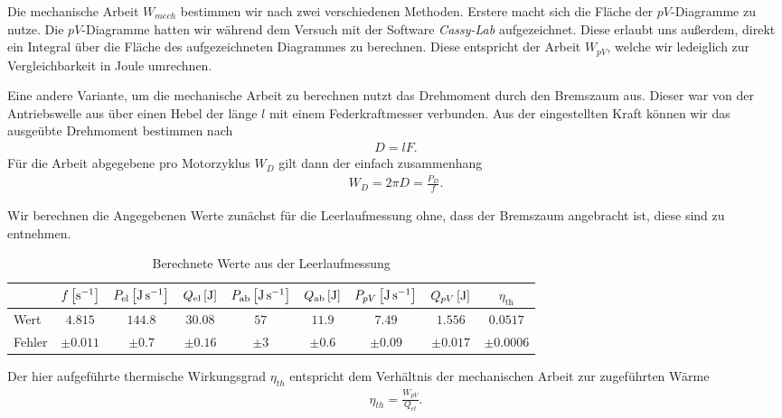 Die mechanische Arbeit $W_{mech}$ bestimmen wir nach zwei verschiedenen Methoden. Erstere macht sich die Fläche der $pV$-Diagramme zu nutze. Die $pV$-Diagramme hatten wir während dem Versuch mit der Software \textit{Cassy-Lab} aufgezeichnet. Diese erlaubt uns außerdem, direkt ein Integral über die Fläche des aufgezeichneten Diagrammes zu berechnen. Diese entspricht der Arbeit $W_{pV}$, welche wir ledeiglich zur Vergleichbarkeit in Joule umrechnen.

Eine andere Variante, um die mechanische Arbeit zu berechnen nutzt das Drehmoment durch den Bremszaum aus. Dieser war von der Antriebswelle aus über einen Hebel der länge $l$ mit einem Federkraftmesser verbunden. Aus der eingestellten Kraft können wir das ausgeübte Drehmoment bestimmen nach
\begin{align}
    D = l F.
\end{align}
Für die Arbeit abgegebene pro Motorzyklus $W_D$ gilt dann der einfach zusammenhang
\begin{align}
    W_D = 2 \pi D = \frac{P_D}{f}.
\end{align}

Wir berechnen die Angegebenen Werte zunächst für die Leerlaufmessung ohne, dass der Bremszaum angebracht ist, diese sind  zu entnehmen. 

\begin{table}[h!]
    \centering
    \begin{tabular}{l | c | c | c | c | c | c | c | c}
    \textbf{} & \boldmath$f\,\qty[\si{\per\second}]$ & \boldmath$P_{\text{el}}\,\qty[\si{\joule\per\second}]$ & \boldmath$Q_{\text{el}}\,\qty[\si{\joule}]$ & \boldmath$P_{\text{ab}}\,\qty[\si{\joule\per\second}]$ & \boldmath$Q_{\text{ab}}\,\qty[\si{\joule}]$ & \boldmath$P_{pV}\,\qty[\si{\joule\per\second}]$ & \boldmath$Q_{pV}\,\qty[\si{\joule}]$ & \boldmath$\eta_{\text{th}}$ \\\hline
    Wert & $4.815$ & $144.8$ & $30.08$ & $57$ & $11.9$ & $7.49$ & $1.556$ & $0.0517$ \\\hline
    Fehler & $\pm 0.011$ & $\pm 0.7$ & $\pm 0.16$ & $\pm 3$ & $\pm 0.6$ & $\pm 0.09$ & $\pm 0.017$ & $\pm 0.0006$ \\
    \end{tabular}
    \caption{Berechnete Werte aus der Leerlaufmessung}
    \label{tab:werte_leerlauf}
\end{table}

Der hier aufgeführte thermische Wirkungsgrad $\eta_{th}$ entspricht dem Verhältnis der mechanischen Arbeit zur zugeführten Wärme
\begin{align}
    \eta_{th} = \frac{W_{pV}}{Q_{el}}.
\end{align}


